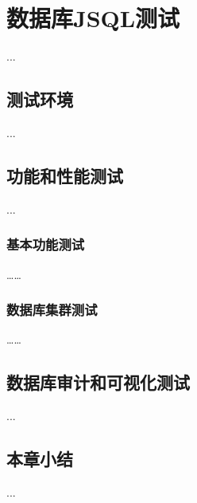 
\chapter{数据库JSQL测试}
...
\section{测试环境}
...
\section{功能和性能测试}
...
\subsection{基本功能测试}
……
\subsection{数据库集群测试}
……
\section{数据库审计和可视化测试}
...
\section{本章小结}
...